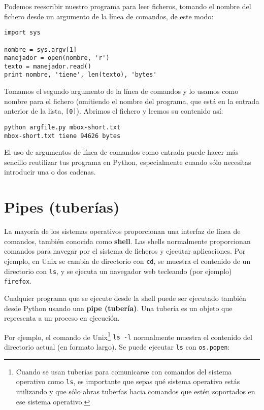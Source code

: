 Podemos reescribir nuestro programa para leer ficheros, tomando el nombre del fichero
desde un argumento de la línea de comandos, de este modo:

\beforeverb
\begin{verbatim}
import sys

nombre = sys.argv[1]
manejador = open(nombre, 'r')
texto = manejador.read()
print nombre, 'tiene', len(texto), 'bytes'
\end{verbatim}
\afterverb
%
Tomamos el segundo argumento de la línea de comandos y lo usamos como nombre para el fichero
(omitiendo el nombre del programa, que está en la entrada anterior de la lista, {\tt [0]}).
Abrimos el fichero y leemos su contenido así:

\beforeverb
\begin{verbatim}
python argfile.py mbox-short.txt
mbox-short.txt tiene 94626 bytes
\end{verbatim}
\afterverb
%
El uso de argumentos de línea de comandos como entrada puede hacer más sencillo reutilizar tus
programa en Python, especialmente cuando sólo necesitas introducir una o dos cadenas.

\section{Pipes (tuberías)}


La mayoría de los sistemas operativos proporcionan una interfaz de línea de comandos,
también conocida como {\bf shell}. Las shells normalmente proporcionan comandos
para navegar por el sistema de ficheros y ejecutar aplicaciones. Por
ejemplo, en Unix se cambia de directorio con {\tt cd},
se muestra el contenido de un directorio con {\tt ls}, y se ejecuta
un navegador web tecleando (por ejemplo) {\tt firefox}.


Cualquier programa que se ejecute desde la shell puede ser ejecutado
también desde Python usando una {\bf pipe (tubería)}. Una tubería es un objeto
que representa a un proceso en ejecución.

Por ejemplo, el comando de Unix\footnote{Cuando se usan tuberías para comunicarse
con comandos del sistema operativo como {\tt ls}, es importante
que sepas qué sistema operativo estás utilizando y que sólo abras
tuberías hacia comandos que estén soportados en ese sistema operativo.}
{\tt ls -l} normalmente muestra el
contenido del directorio actual (en formato largo). Se puede
ejecutar {\tt ls} con {\tt os.popen}:

